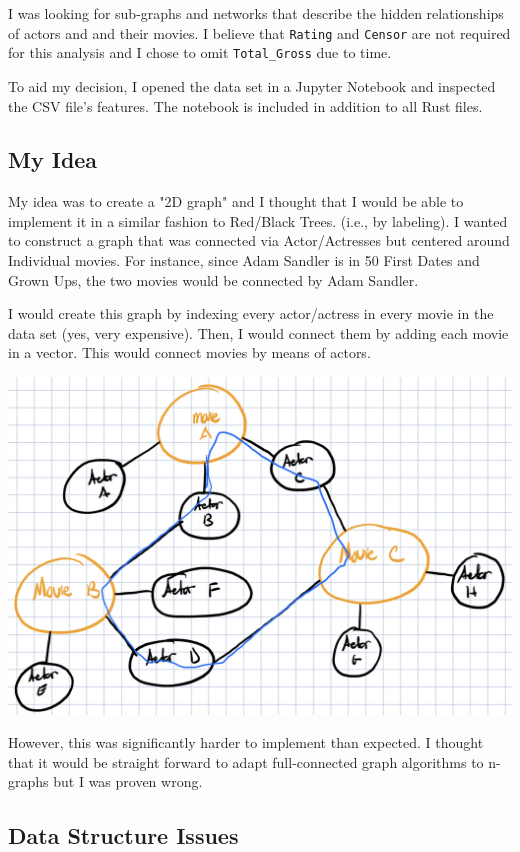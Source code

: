 \documentclass[12pt,letterpaper]{article}
\begin{document}
I was looking for sub-graphs and networks that describe the hidden relationships of actors and and their movies.  I believe that \texttt{Rating} and \texttt{Censor} are not required for this analysis and I chose to omit \texttt{Total\_Gross} due to time. 

To aid my decision, I opened the data set in a Jupyter Notebook and inspected the CSV file's features. The notebook is included in addition to all Rust files. 

\subsection{My Idea}

My idea was to create a "2D graph" and I thought that I would be able to implement it in a similar fashion to Red/Black Trees. (i.e., by labeling). I wanted to construct a graph that was connected via Actor/Actresses but centered around Individual movies. For instance,  since Adam Sandler is in 50 First Dates and Grown Ups, the two movies would be connected by Adam Sandler.  

I would create this graph by indexing every actor/actress in every movie in the data set (yes, very expensive). Then, I would connect them by adding each movie in a vector.  This would connect movies by means of actors. 

\includegraphics[scale=.24]{draft-graph.jpeg}

However,  this was significantly harder to implement than expected.  I thought that it would be straight forward to adapt full-connected graph algorithms to n-graphs but I was proven wrong.  


\subsection{Data Structure Issues}
\end{document}
